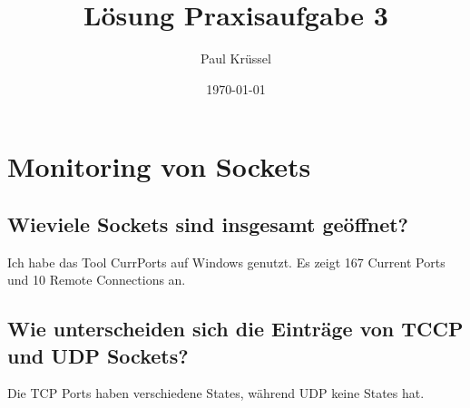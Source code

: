 \documentclass{kdiartcl}
\institute{Fachbereich Angewandte Informatik}
\date{\today}
\author{Paul Krüssel}
\title{Lösung Praxisaufgabe 3}
\begin{document}
\maketitle

\setcounter{section}{1}

\section{Monitoring von Sockets}
\subsection{Wieviele Sockets sind insgesamt geöffnet?}
Ich habe das Tool CurrPorts auf Windows genutzt. Es zeigt 167 Current Ports und 10 Remote Connections an.
\subsection{Wie unterscheiden sich die Einträge von TCCP und UDP Sockets?}
Die TCP Ports haben verschiedene States, während UDP keine States hat.
\end{document}

